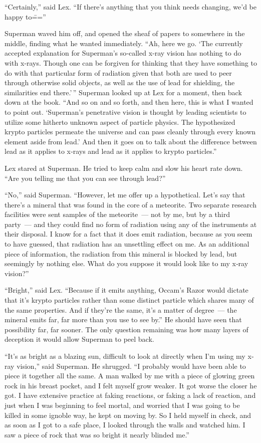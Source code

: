 ``Certainly,'' said Lex. ``If there's anything that you think needs
changing, we'd be happy to\===''

Superman waved him off, and opened the sheaf of papers to somewhere in
the middle, finding what he wanted immediately. ``Ah, here we go. `The
currently accepted explanation for Superman's so‐called x‐ray vision has
nothing to do with x‐rays. Though one can be forgiven for thinking that
they have something to do with that particular form of radiation given
that both are used to peer through otherwise solid objects, as well as
the use of lead for shielding, the similarities end there.'\,'' Superman
looked up at Lex for a moment, then back down at the book. ``And so on
and so forth, and then here, this is what I wanted to point out.
`Superman's penetrative vision is thought by leading scientists to
utilize some hitherto unknown aspect of particle physics. The
hypothesized krypto particles permeate the universe and can pass cleanly
through every known element aside from lead.' And then it goes on to
talk about the difference between lead as it applies to x‐rays and lead
as it applies to krypto particles.''

Lex stared at Superman. He tried to keep calm and slow his heart rate
down. ``Are you telling me that you can see through lead?''

``No,'' said Superman. ``However, let me offer up a hypothetical. Let's
say that there's a mineral that was found in the core of a meteorite.
Two separate research facilities were sent samples of the meteorite~---
not by me, but by a third party~--- and they could find no form of
radiation using any of the instruments at their disposal. I know for a
fact that it does emit radiation, because as you seem to have guessed,
that radiation has an unsettling effect on me. As an additional piece of
information, the radiation from this mineral is blocked by lead, but
seemingly by nothing else. What do you suppose it would look like to my
x‐ray vision?''

``Bright,'' said Lex. ``Because if it emits anything, Occam's Razor
would dictate that it's krypto particles rather than some distinct
particle which shares many of the same properties. And if they're the
same, it's a matter of degree~--- the mineral emits far, far more than
you use to see by.'' He should have seen that possibility far, far
sooner. The only question remaining was how many layers of deception it
would allow Superman to peel back.

``It's as bright as a blazing sun, difficult to look at directly when
I'm using my x‐ray vision,'' said Superman. He shrugged. ``I probably
would have been able to piece it together all the same. A man walked by
me with a piece of glowing green rock in his breast pocket, and I felt
myself grow weaker. It got worse the closer he got. I have extensive
practice at faking reactions, or faking a lack of reaction, and just
when I was beginning to feel mortal, and worried that I was going to be
killed in some ignoble way, he kept on moving by. So I held myself in
check, and as soon as I got to a safe place, I looked through the walls
and watched him. I saw a piece of rock that was so bright it nearly
blinded me.''

